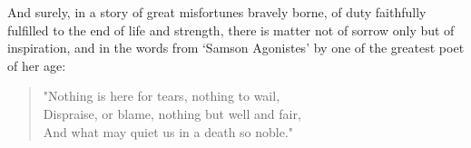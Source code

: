And surely, in a story of great misfortunes bravely borne, of duty faithfully fulfilled to the end of life and strength, there is matter not of sorrow only but of inspiration, and in the words from ‘Samson Agonistes’ by one of the greatest poet of her age:\\

\begin{quote}
 	"Nothing is here for tears, nothing to wail,\\
 	Dispraise, or blame, nothing but well and fair,\\
 	And what may quiet us in a death so noble."\\
\end{quote}

